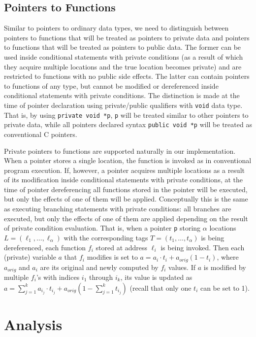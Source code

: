 \documentclass[11pt]{article}
\begin{document}
\subsection{Pointers to Functions}

Similar to pointers to ordinary data types, we need to distinguish between
pointers to functions that will be treated as pointers to private data and
pointers to functions that will be treated as pointers to public data. The
former can be used inside conditional statements with private conditions (as
a result of which they acquire multiple locations and the true location
becomes private) and are restricted to functions with no public side
effects. The latter can contain pointers to functions of any type, but
cannot be modified or dereferenced inside conditional statements with
private conditions. The distinction is made at the time of pointer
declaration using private/public qualifiers with \texttt{void} data type.
That is, by using \texttt{private void *p}, \texttt{p} will be treated
similar to other pointers to private data, while all pointers declared
syntax \texttt{public void *p} will be treated as conventional C pointers.

Private pointers to functions are supported naturally in our implementation.
When a pointer stores a single location, the function is invoked as in
conventional program execution. If, however, a pointer acquires multiple
locations as a result of its modification inside conditional statements with
private conditions, at the time of pointer dereferencing all functions
stored in the pointer will be executed, but only the effects of one of them
will be applied. Conceptually this is the same as executing branching
statements with private conditions: all branches are executed, but only the
effects of one of them are applied depending on the result of private
condition evaluation. That is, when a pointer \texttt{p} storing $\alpha$
locations $L = (\ell_1, \ldots, \ell_\alpha)$ with the corresponding tags $T
= (t_1, \ldots, t_\alpha)$ is being dereferenced, each function $f_i$ stored
at address $\ell_i$ is being invoked. Then each (private) variable $a$ that
$f_i$ modifies is set to $a = a_i \cdot t_i + a_{orig} (1-t_i)$, where
$a_{orig}$ and $a_i$ are its original and newly computed by $f_i$ values. If
$a$ is modified by multiple $f_i$'s with indices ${i_1}$ through ${i_k}$,
its value is updated as $a = \sum_{j=1}^k a_{i_j} \cdot t_{i_j} +
a_{orig}(1- \sum_{j=1}^k t_{i_j})$ (recall that only one $t_i$ can be set to
1).

\section{Analysis}
\label{sec:analysis}
\end{document}
